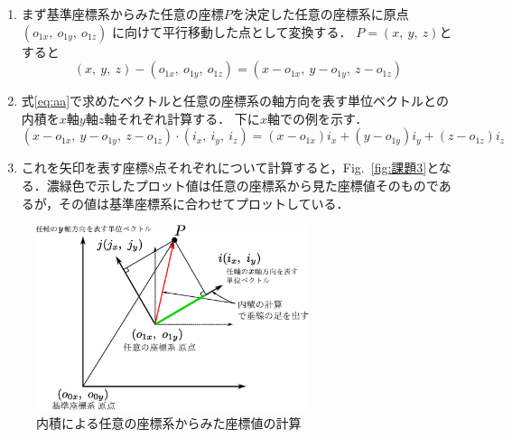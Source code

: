 \documentclass[a4paper,10pt]{jsarticle}
\begin{document}
\begin{enumerate}[{(}1{)}]
  \item まず基準座標系からみた任意の座標$P$を決定した任意の座標系に原点$(o_{1x},\ o_{1y},\ o_{1z})$ に向けて平行移動した点として変換する．
        $P=(x,\ y,\ z)$とすると
        \begin{equation}
        \label{eq:aa}
        (x,\ y,\ z)- (o_{1x},\ o_{1y},\ o_{1z}) = (x- o_{1x},\ y-o_{1y},\  z-o_{1z})
        \end{equation}

  \item 式\eqref{eq:aa}で求めたベクトルと任意の座標系の軸方向を表す単位ベクトルとの内積を$x$軸$y$軸$z$軸それぞれ計算する．
        下に$x$軸での例を示す．
        \begin{equation}
        \label{eq:aa}
        (x-o_{1x},\ y-o_{1y},\  z-o_{1z})\cdot (i_x,\ i_y,\ i_z) = (x-o_{1x})i_x + (y-o_{1y})i_y + (z-o_{1z})i_z
        \end{equation}
  \item これを矢印を表す座標8点それぞれについて計算すると，Fig.~\ref{fig:課題3}となる．濃緑色で示したプロット値は任意の座標系から見た座標値そのものであるが，その値は基準座標系に合わせてプロットしている．
\end{enumerate}

\begin{figure}[t]
  \begin{center}
    \includegraphics[clip,width=8cm]{fig/eps/1B3.eps}
  \end{center}
  \caption{内積による任意の座標系からみた座標値の計算}
  \label{fig:内積による任意の座標系からみた座標値の計算}
\end{figure}
\end{document}
